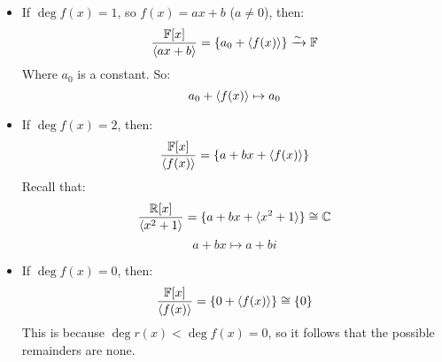 \documentclass[letterpaper]{article}
\begin{document}
\begin{itemize}
    \item If $\deg f(x) = 1$, so $f(x) = ax + b$ ($a \neq 0$), then: 
    \[\frac{\mathbb{F}[x]}{\langle ax + b \rangle} = \{a_0 + \langle f(x) \rangle\} \xrightarrow{\sim} \mathbb{F}\]
    Where $a_0$ is a constant. So:
    \[a_0 + \langle f(x) \rangle \mapsto a_0\]

    \item If $\deg f(x) = 2$, then: 
    \[\frac{\mathbb{F}[x]}{\langle f(x) \rangle} = \{a + bx + \langle f(x) \rangle\}\]
    Recall that: 
    \[\frac{\mathbb{R}[x]}{\langle x^2 + 1 \rangle} = \{a + bx + \langle x^2 + 1 \rangle\} \cong \mathbb{C}\]
    \[a + bx \mapsto a + bi\]

    \item If $\deg f(x) = 0$, then: 
    \[\frac{\mathbb{F}[x]}{\langle f(x) \rangle} = \{0 + \langle f(x) \rangle\} \cong \{0\}\]
    This is because $\deg r(x) < \deg f(x) = 0$, so it follows that the possible remainders are none. 
\end{itemize}
\end{document}

